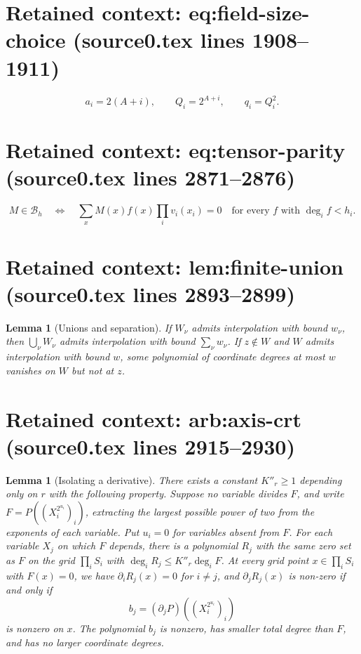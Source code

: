 \documentclass[10pt,a4paper]{amsart}
\newcommand{\cB}{\mathcal B}
\theoremstyle{plain}
\newtheorem{lemma}[theorem]{Lemma}
\theoremstyle{definition}
\theoremstyle{remark}
\begin{document}
\section*{Retained context: eq:field-size-choice (source0.tex lines 1908--1911)}

\begin{equation}
 a_i=2(A+i),\qquad Q_i=2^{A+i},\qquad q_i=Q_i^2.
 \label{eq:field-size-choice}
\end{equation}


\section*{Retained context: eq:tensor-parity (source0.tex lines 2871--2876)}

\begin{equation}
 M\in\cB_h\quad\Longleftrightarrow\quad
 \sum_x M(x)f(x)\prod_i v_i(x_i)=0
 \quad\text{for every }f\text{ with }\deg_i f<h_i.
 \label{eq:tensor-parity}
\end{equation}


\section*{Retained context: lem:finite-union (source0.tex lines 2893--2899)}

\begin{lemma}[Unions and separation]\label{lem:finite-union}
If $W_\nu$ admits interpolation with bound $w_\nu$, then
$\bigcup_\nu W_\nu$ admits interpolation with bound $\sum_\nu w_\nu$.
If $z\notin W$ and $W$ admits interpolation with bound $w$, some
polynomial of coordinate degrees at most $w$ vanishes on $W$
but not at $z$.
\end{lemma}


\section*{Retained context: arb:axis-crt (source0.tex lines 2915--2930)}

\begin{lemma}[Isolating a derivative]\label{arb:axis-crt}\label{lem:CRT}
There exists a constant $K''_r \ge 1$ depending only on $r$ with the following property.
Suppose no variable divides $F$, and write
$F=P((X_i^{2^{u_i}})_i)$, extracting the largest possible power
of two from the exponents of each variable. Put $u_i=0$ for
variables absent from $F$.
For each variable $X_j$ on which $F$ depends, there is a polynomial
$R_j$ with the same zero set as $F$ on the grid $\prod_i S_i$ with $\deg_iR_j\le K''_r\deg_iF$.
At every grid point $x \in \prod_i S_i$ with $F(x)=0$, we have $\partial_iR_j(x)=0$ for $i\ne j$, and
$\partial_j R_j(x)$ is non-zero if and only if
\[
 b_j=(\partial_jP)((X_i^{2^{u_i}})_i)
\]
is nonzero on $x$. The polynomial $b_j$ is nonzero, has smaller total
degree than $F$, and has no larger coordinate degrees.
\end{lemma}
\end{document}
